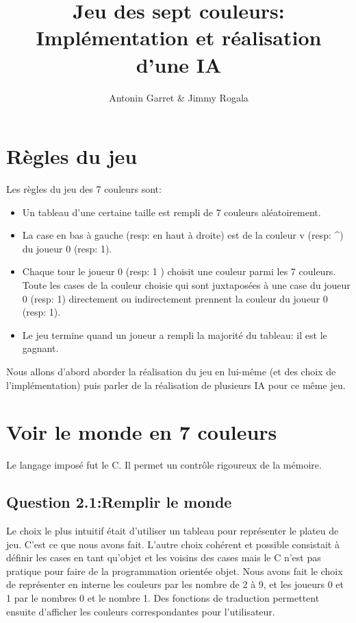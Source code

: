 \documentclass[11pt]{article}
\title{Jeu des sept couleurs: Implémentation et réalisation d'une IA}
\author{Antonin Garret & Jimmy Rogala}
\begin{document}

\section{Règles du jeu}
    Les règles du jeu des 7 couleurs sont:
    \begin{itemize} %
      \item Un tableau d'une certaine taille est rempli de 7 couleurs aléatoirement.
      \item La case en bas à gauche (resp: en haut à droite) est de la couleur v (resp: \textasciicircum ) du joueur 0 (resp: 1).
      \item Chaque tour le joueur 0 (resp: 1 ) choisit une couleur parmi les 7 couleurs. Toute les cases de la couleur choisie qui sont juxtaposées à une case du joueur 0 (resp: 1) directement ou indirectement prennent la couleur du joueur 0 (resp: 1).
      \item Le jeu termine quand un joueur a rempli la majorité du tableau: il est le gagnant.
    \end{itemize}
    Nous allons d'abord aborder la réalisation du jeu en lui-même (et des choix de l'implémentation) puis parler de la réalisation de plusieurs IA pour ce même jeu.
\section{Voir le monde en 7 couleurs}
    Le langage imposé fut le C. Il permet un contrôle rigoureux de la mémoire.
    \subsection{Question 2.1:Remplir le monde}
      Le choix le plus intuitif était d'utiliser un tableau pour représenter le plateu de jeu. C'est ce que nous avons fait. L'autre choix cohérent et possible consistait à définir les cases en tant qu'objet et les voisins des cases mais le C n'est pas pratique pour faire de la programmation orientée objet.
      Nous avons fait le choix de représenter en interne les couleurs par les nombre de 2 à 9, et les joueurs 0 et 1 par le nombres 0 et le nombre 1. Des fonctions de traduction permettent ensuite d'afficher les couleurs correspondantes pour l'utilisateur.
\end{document}
